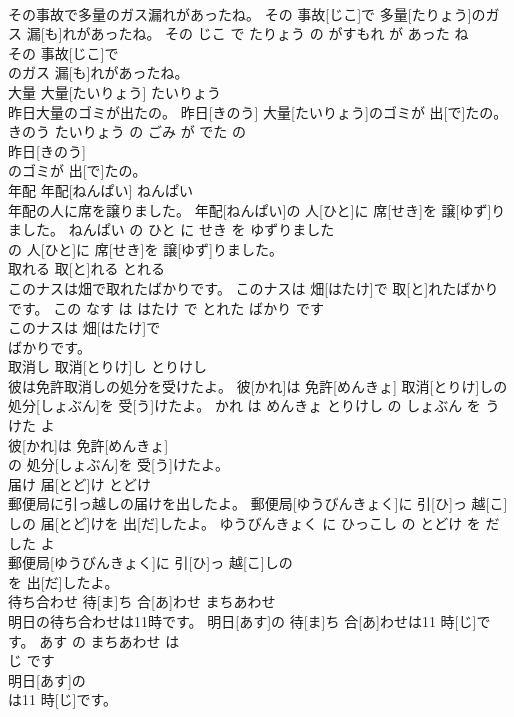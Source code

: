 \documentclass[8pt]{extreport}
\begin{document}
\begin{CJK}{UTF8}{min}
\\	その事故で多量のガス漏れがあったね。	その 事故[じこ]で 多量[たりょう]のガス 漏[も]れがあったね。	その じこ で たりょう の がすもれ が あった ね	
\\	その 事故[じこ]で
\\	のガス 漏[も]れがあったね。			
\\	大量	大量[たいりょう]	たいりょう	
\\	昨日大量のゴミが出たの。	昨日[きのう] 大量[たいりょう]のゴミが 出[で]たの。	きのう たいりょう の ごみ が でた の	
\\	昨日[きのう]
\\	のゴミが 出[で]たの。			
\\	年配	年配[ねんぱい]	ねんぱい	
\\	年配の人に席を譲りました。	年配[ねんぱい]の 人[ひと]に 席[せき]を 譲[ゆず]りました。	ねんぱい の ひと に せき を ゆずりました	
\\	の 人[ひと]に 席[せき]を 譲[ゆず]りました。			
\\	取れる	取[と]れる	とれる	
\\	このナスは畑で取れたばかりです。	このナスは 畑[はたけ]で 取[と]れたばかりです。	この なす は はたけ で とれた ばかり です	
\\	このナスは 畑[はたけ]で
\\	ばかりです。			
\\	取消し	取消[とりけ]し	とりけし	
\\	彼は免許取消しの処分を受けたよ。	彼[かれ]は 免許[めんきょ] 取消[とりけ]しの 処分[しょぶん]を 受[う]けたよ。	かれ は めんきょ とりけし の しょぶん を うけた よ	
\\	彼[かれ]は 免許[めんきょ]
\\	の 処分[しょぶん]を 受[う]けたよ。			
\\	届け	届[とど]け	とどけ	
\\	郵便局に引っ越しの届けを出したよ。	郵便局[ゆうびんきょく]に 引[ひ]っ 越[こ]しの 届[とど]けを 出[だ]したよ。	ゆうびんきょく に ひっこし の とどけ を だした よ	
\\	郵便局[ゆうびんきょく]に 引[ひ]っ 越[こ]しの
\\	を 出[だ]したよ。			
\\	待ち合わせ	待[ま]ち 合[あ]わせ	まちあわせ	
\\	明日の待ち合わせは11時です。	明日[あす]の 待[ま]ち 合[あ]わせは11 時[じ]です。	あす の まちあわせ は 
\\	じ です	
\\	明日[あす]の
\\	は11 時[じ]です。			

\end{CJK}
\end{document}
